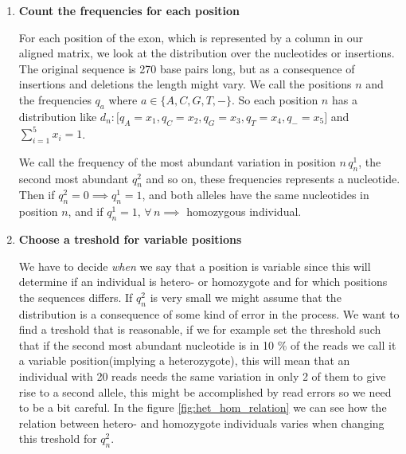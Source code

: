 \documentclass[a4paper,11pt]{kth-mag}
\begin{document}
\begin{enumerate}
	\item \textbf{Count the frequencies for each position}

	For each position of the exon, which is represented by a column in our aligned matrix, we look at the distribution over the nucleotides or insertions. The original sequence is 270 base pairs long, but as a consequence of insertions and deletions the length might vary. We call the positions $n$ and the frequencies $q_a$ where $a\in \{A,C,G,T,-\}$. So each position $n$ has a distribution like $d_n: \lbrack q_A=x_1, q_C=x_2, q_G=x_3, q_T=x_4, q_{-}=x_5 \rbrack $ and $\sum_{i=1}^{5}x_i = 1$.
	
We call the frequency of the most abundant variation in position $n \, q_n^1$, the second most abundant $q_n^2$ and so on, these frequencies represents a nucleotide. Then if $q_n^2 = 0 \implies q_n^1=1$, and both alleles have the same nucleotides in position $n$, and if $q_n^1 = 1, \, \forall \, n \implies$ homozygous individual.

	\item \textbf{Choose a treshold for variable positions}

	We have to decide \emph{when} we say that a position is variable since this will determine if an individual is hetero- or homozygote and for which positions the sequences differs. If $q_n^2$ is very small we might assume that the distribution is a consequence of some kind of error in the process. We want to find a treshold that is reasonable, if we for example set the threshold such that if the second most abundant nucleotide is in 10 \% of the reads we call it a variable position(implying a heterozygote), this will mean that an individual with 20 reads needs the same variation in only 2 of them to give rise to a second allele, this might be accomplished by read errors so we need to be a bit careful. In the figure \ref{fig:het_hom_relation} we can see how the relation between hetero- and homozygote individuals varies when changing this treshold for $q_n^2$.


\end{enumerate}
\end{document}
